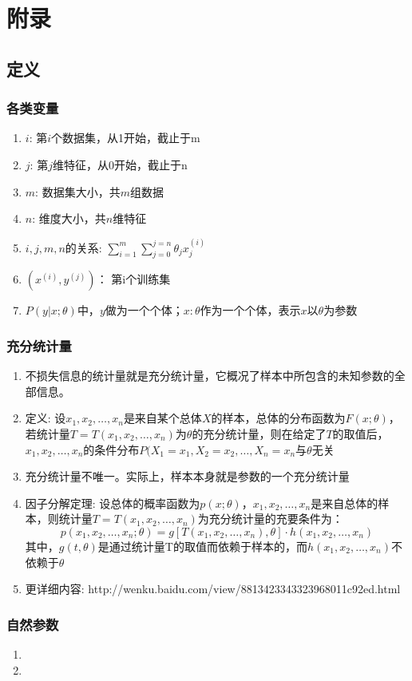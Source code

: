\section{附录}
\subsection{定义}
\subsubsection{各类变量}
\begin{enumerate}
	\item $i$: 第$i$个数据集，从1开始，截止于m
	\item $j$: 第$j$维特征，从0开始，截止于n
	\item $m$: 数据集大小，共$m$组数据
	\item $n$: 维度大小，共$n$维特征
	\item $i, j, m, n$的关系: $\sum_{i=1}^{m}\sum_{j=0}^{j=n}{\theta_{j}x_j^{(i)}}$
	\item $(x^{(i)}, y^{(j)})$： 第i个训练集
	\item $P(y|x;\theta)$中，$y$做为一个个体；$x:\theta$作为一个个体，表示$x$以$\theta$为参数
\end{enumerate}

\subsubsection{充分统计量}
\begin{enumerate}
	\item 不损失信息的统计量就是充分统计量，它概况了样本中所包含的未知参数的全部信息。
	\item 定义: 设$x_1, x_2, \dots, x_n$是来自某个总体$X$的样本，总体的分布函数为$F(x;\theta)$，若统计量$T=T(x_1, x_2, \dots, x_n)$为$\theta$的充分统计量，则在给定了$T$的取值后，$x_1, x_2, \dots, x_n$的条件分布$P(X_1=x_1, X_2=x_2, \dots, X_n=x_n$与$\theta$无关
	\item 充分统计量不唯一。实际上，样本本身就是参数的一个充分统计量
	\item 因子分解定理{\color{red}{（没看懂）}}: 设总体的概率函数为$p(x;\theta)$，$x_1, x_2, \dots, x_n$是来自总体的样本，则统计量$T=T(x_1, x_2, \dots, x_n)$为充分统计量的充要条件为：
	\begin{equation}
		p(x_1, x_2, \dots, x_n;\theta) = g\left[T(x_1, x_2, \dots, x_n),\theta\right]\cdot h(x_1, x_2, \dots, x_n)
	\end{equation}
	其中，$g(t,\theta)$是通过统计量T的取值而依赖于样本的，而$h(x_1, x_2, \dots, x_n)$不依赖于$\theta$
	\item 更详细内容: http://wenku.baidu.com/view/8813423343323968011c92ed.html
\end{enumerate}

\subsubsection{自然参数}
\begin{enumerate}
	\item 
	\item 
\end{enumerate}

